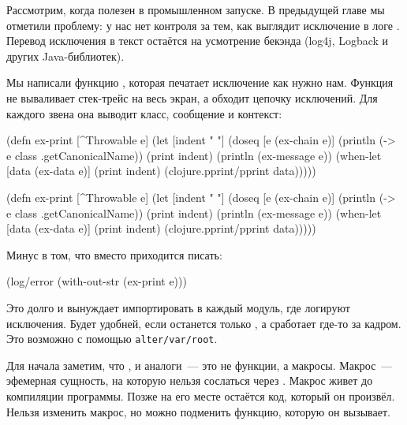 \label{install-logger}


Рассмотрим, когда  полезен в промышленном запуске. В
предыдущей главе мы отметили проблему: у нас нет контроля за тем, как выглядит
исключение в логе . Перевод исключения в текст остаётся на
усмотрение бекэнда (log4j, Logback и других Java-библиотек).

Мы написали функцию , которая печатает исключение как нужно
нам. Функция не вываливает стек-трейс на весь экран, а обходит цепочку
исключений. Для каждого звена она выводит класс, сообщение и контекст:

\ifnarrow

\begin{clojure}
(defn ex-print
  [^Throwable e]
  (let [indent "  "]
    (doseq [e (ex-chain e)]
      (println (-> e
                   class
                   .getCanonicalName))
      (print indent)
      (println (ex-message e))
      (when-let [data (ex-data e)]
        (print indent)
        (clojure.pprint/pprint data)))))
\end{clojure}

\else

\begin{clojure}
(defn ex-print
  [^Throwable e]
  (let [indent "  "]
    (doseq [e (ex-chain e)]
      (println (-> e class .getCanonicalName))
      (print indent)
      (println (ex-message e))
      (when-let [data (ex-data e)]
        (print indent)
        (clojure.pprint/pprint data)))))
\end{clojure}

\fi

\noindent
Минус в том, что вместо  приходится писать:

\begin{clojure}
(log/error (with-out-str (ex-print e)))
\end{clojure}

Это долго и вынуждает импортировать  в каждый модуль, где логируют
исключения. Будет удобней, если останется только , а
 сработает где-то за кадром. Это возможно с помощью
\texttt{alter\-/var\-/root}.

Для начала заметим, что ,  и аналоги~--- это не
функции, а макросы. Макрос~--- эфемерная сущность, на которую нельзя сослаться
через . Макрос живет до компиляции программы. Позже на его месте
остаётся код, который он произвёл. Нельзя изменить макрос, но можно подменить
функцию, которую он вызывает.

